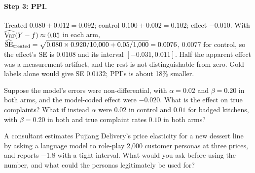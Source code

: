\documentclass[11pt]{article}
\begin{document}
\paragraph{Step 3: PPI.} Treated $0.080 + 0.012 = 0.092$; control $0.100 + 0.002 = 0.102$; effect $-0.010$. With $\widehat{\operatorname{Var}}(Y - f) \approx 0.05$ in each arm,
$\widehat{\operatorname{SE}}_{\text{treated}} = \sqrt{0.080 \times 0.920/10{,}000 + 0.05/1{,}000} = 0.0076$, $0.0077$ for control, so the effect's SE is $0.0108$ and its
interval $[-0.031, 0.011]$. Half the apparent effect was a measurement artifact, and the rest is not distinguishable from zero. Gold labels
alone would give SE $0.0132$; PPI's is about 18\% smaller.

\begin{exercise}[computation]
Suppose the model's errors were non-differential, with $\alpha = 0.02$ and $\beta = 0.20$ in both arms, and the model-coded effect were $-0.020$.
What is the effect on true complaints? What if instead $\alpha$ were $0.02$ in control and $0.01$ for badged kitchens, with $\beta = 0.20$ in both and
true complaint rates $0.10$ in both arms?
\end{exercise}

\begin{exercise}[judgment]
A consultant estimates Pujiang Delivery's price elasticity for a new dessert line by asking a language model to role-play 2{,}000 customer personas
at three prices, and reports $-1.8$ with a tight interval. What would you ask before using the number, and what could the personas legitimately
be used for?
\end{exercise}

\sectionthree
\end{document}
